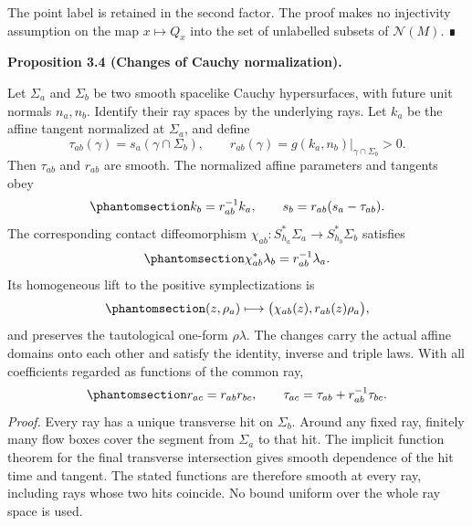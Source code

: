 \documentclass[
  english,
  11pt,
  reqno]{amsart}
\makeatletter
\newcommand{\pandocstatementheading}[1]{%
  \par\addpenalty{\@beginparpenalty}%
  \addvspace{.5\baselineskip plus .2\baselineskip minus .2\baselineskip}%
  {\normalfont\bfseries #1\par}%
  \nobreak\@afterindenttrue\@afterheading
}
\makeatother
\begin{document}
The point label is retained in the second factor. The proof makes no
injectivity assumption on the map \(x\mapsto Q_x\) into the set of
unlabelled subsets of \(\mathcal N(M)\). ∎

\pandocstatementheading{\protect{}\label{prop:global-cauchy-affine-change}Proposition 3.4 (Changes of Cauchy normalization).}

Let \(\Sigma_a\) and \(\Sigma_b\) be two smooth spacelike Cauchy
hypersurfaces, with future unit normals \(n_a,n_b\). Identify their ray
spaces by the underlying rays. Let \(k_a\) be the affine tangent
normalized at \(\Sigma_a\), and define \[
\tau_{ab}(\gamma)=s_a(\gamma\cap\Sigma_b),
\qquad
r_{ab}(\gamma)=g(k_a,n_b)|_{\gamma\cap\Sigma_b}>0.
\] Then \(\tau_{ab}\) and \(r_{ab}\) are smooth. The normalized affine
parameters and tangents obey
\begin{equation}\protect\phantomsection\label{eq:global-cauchy-affine-change}{
k_b=r_{ab}^{-1}k_a,
\qquad
s_b=r_{ab}(s_a-\tau_{ab}).
}\end{equation} The corresponding contact diffeomorphism
\(\chi_{ab}:S_{h_a}^*\Sigma_a\to S_{h_b}^*\Sigma_b\) satisfies
\begin{equation}\protect\phantomsection\label{eq:global-cauchy-contact-multiplier}{
\chi_{ab}^*\lambda_b=r_{ab}^{-1}\lambda_a.
}\end{equation} Its homogeneous lift to the positive symplectizations is
\begin{equation}\protect\phantomsection\label{eq:global-cauchy-homogeneous-lift}{
(z,\rho_a)\longmapsto
\bigl(\chi_{ab}(z),r_{ab}(z)\rho_a\bigr),
}\end{equation} and preserves the tautological one-form \(\rho\lambda\).
The changes carry the actual affine domains onto each other and satisfy
the identity, inverse and triple laws. With all coefficients regarded as
functions of the common ray,
\begin{equation}\protect\phantomsection\label{eq:global-cauchy-affine-cocycle}{
r_{ac}=r_{ab}r_{bc},
\qquad
\tau_{ac}=\tau_{ab}+r_{ab}^{-1}\tau_{bc}.
}\end{equation} \emph{Proof.} Every ray has a unique transverse hit on
\(\Sigma_b\). Around any fixed ray, finitely many flow boxes cover the
segment from \(\Sigma_a\) to that hit. The implicit function theorem for
the final transverse intersection gives smooth dependence of the hit
time and tangent. The stated functions are therefore smooth at every
ray, including rays whose two hits coincide. No bound uniform over the
whole ray space is used.
\end{document}
